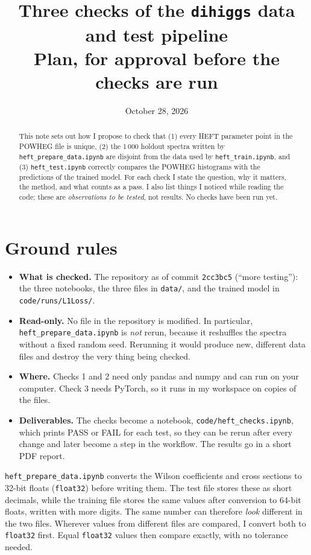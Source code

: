 \documentclass[11pt]{article}
\title{\textbf{Three checks of the \texttt{dihiggs} data and test pipeline}\\[4pt]
\large Plan, for approval before the checks are run}
\date{October 28, 2026}
\newcommand{\file}[1]{\nolinkurl{#1}}
\newcommand{\code}[1]{\texttt{#1}}
\begin{document}
\maketitle

\begin{abstract}
\noindent
This note sets out how I propose to check that (1) every HEFT parameter point
in the POWHEG file is unique, (2) the 1\,000 holdout spectra written by
\code{heft\_prepare\_data.ipynb} are disjoint from the data used by
\code{heft\_train.ipynb}, and (3) \code{heft\_test.ipynb} correctly compares the
POWHEG histograms with the predictions of the trained model. For each check I
state the question, why it matters, the method, and what counts as a pass. I also
list things I noticed while reading the code; these are \emph{observations to be
tested}, not results. No checks have been run yet.
\end{abstract}

\section{Ground rules}

\begin{itemize}
  \item \textbf{What is checked.} The repository as of commit \code{2cc3bc5}
  (``more testing''): the three notebooks, the three files in \file{data/}, and
  the trained model in \file{code/runs/L1Loss/}.
  \item \textbf{Read-only.} No file in the repository is modified. In
  particular, \code{heft\_prepare\_data.ipynb} is \emph{not} rerun, because it
  reshuffles the spectra without a fixed random seed. Rerunning it would
  produce new, different data files and destroy the very thing being checked.
  \item \textbf{Where.} Checks 1 and 2 need only pandas and numpy and can run on
  your computer. Check 3 needs PyTorch, so it runs in my workspace on copies of the
  files.
  \item \textbf{Deliverables.} The checks become a notebook,
  \file{code/heft_checks.ipynb}, which prints PASS or FAIL for each test, so
  they can be rerun after every change and later become a step in the workflow.
  The results go in a short PDF report.
\end{itemize}

\begin{aside}
\code{heft\_prepare\_data.ipynb} converts the Wilson coefficients and cross
sections to 32-bit floats (\code{float32}) before writing them. The test file stores
these as short decimals, while the training file stores the same values after
conversion to 64-bit floats, written with more digits. The same number can
therefore \emph{look} different in the two files. Wherever values from different
files are compared, I convert both to \code{float32} first. Equal \code{float32}
values then compare exactly, with no tolerance needed.
\end{aside}
\end{document}
